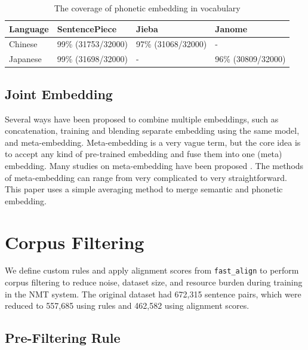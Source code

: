 \vspace{0.5cm}
\begin{table}[h]
    \centering
    \begin{tabularx}{.9\textwidth}{ssss}\toprule
        Language & SentencePiece & Jieba & Janome \\\midrule
        Chinese & 99\% (31753/32000) & 97\% (31068/32000) & - \\
        Japanese & 99\% (31698/32000) & - & 96\% (30809/32000) \\
        \bottomrule
    \end{tabularx}
    \caption{The coverage of phonetic embedding in vocabulary}
    \label{tab:phonetic_coverage}
\end{table}

\subsection{Joint Embedding} \label{sec:joint_embedding}

Several ways have been proposed to combine multiple embeddings, such as concatenation, training and blending separate embedding using the same model, and meta-embedding. Meta-embedding is a very vague term, but the core idea is to accept any kind of pre-trained embedding and fuse them into one (meta) embedding. Many studies on meta-embedding have been proposed \cite{kiela-etal-2018-dynamic, yin2015learning, muromagi2017linear}. The methods of meta-embedding can range from very complicated to very straightforward. This paper uses a simple averaging method \cite{coates-bollegala-2018-frustratingly} to merge semantic and phonetic embedding.

\section{Corpus Filtering} \label{sec:corpus_filtering}

We define custom rules and apply alignment scores from \texttt{fast\_align} \cite{dyer2013simple} to perform corpus filtering to reduce noise, dataset size, and resource burden during training in the NMT system. The original dataset had 672,315 sentence pairs, which were reduced to 557,685 using rules and 462,582 using alignment scores.

\subsection{Pre-Filtering Rule}

